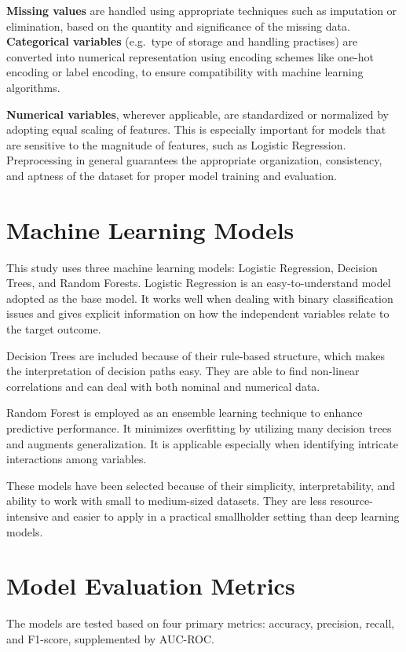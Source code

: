 \textbf{Missing values} are handled using appropriate techniques such as imputation or elimination,
based on the quantity and significance of the missing data. \textbf{Categorical variables} (e.g.\
type of storage and handling practises) are converted into numerical representation using encoding
schemes like one-hot encoding or label encoding, to ensure compatibility with machine learning
algorithms.

\textbf{Numerical variables}, wherever applicable, are standardized or normalized by adopting equal
scaling of features. This is especially important for models that are sensitive to the magnitude of
features, such as Logistic Regression. Preprocessing in general guarantees the appropriate
organization, consistency, and aptness of the dataset for proper model training and evaluation.


\section{Machine Learning Models}

This study uses three machine learning models: Logistic Regression, Decision Trees, and Random
Forests. Logistic Regression is an easy-to-understand model adopted as the base model. It works
well when dealing with binary classification issues and gives explicit information on how the
independent variables relate to the target outcome.

Decision Trees are included because of their rule-based structure, which makes the interpretation of
decision paths easy. They are able to find non-linear correlations and can deal with both nominal
and numerical data.

Random Forest is employed as an ensemble learning technique to enhance predictive performance. It
minimizes overfitting by utilizing many decision trees and augments generalization. It is applicable
especially when identifying intricate interactions among variables.

These models have been selected because of their simplicity, interpretability, and ability to work
with small to medium-sized datasets. They are less resource-intensive and easier to apply in a
practical smallholder setting than deep learning models.


\section{Model Evaluation Metrics}

The models are tested based on four primary metrics: accuracy, precision, recall, and F1-score,
supplemented by AUC-ROC.

